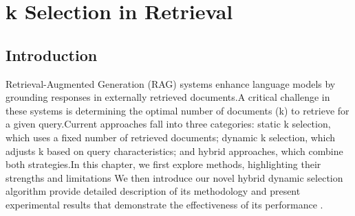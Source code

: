 \chapter{k Selection in Retrieval}
\pagestyle{fancy}
\pagestyle{fancy}\chead{} \pagestyle{fancy}\rhead{}
\pagestyle{fancy} 
\pagestyle{fancy}\cfoot{} \pagestyle{fancy}\rfoot{\thepage}
\section{Introduction}
Retrieval-Augmented Generation (RAG) systems enhance language models by grounding responses in externally retrieved documents.A critical challenge in these systems is determining the optimal number of documents (k) to retrieve for a given query.Current approaches fall into three categories: static k selection, which uses a fixed number of retrieved documents; dynamic k selection, which adjusts k based on query  characteristics; and hybrid approaches, which combine both strategies.In this chapter, we first explore methods, highlighting their strengths and limitations We then introduce our novel hybrid dynamic selection algorithm provide detailed description of its methodology and present experimental results that demonstrate the effectiveness of its performance . 
